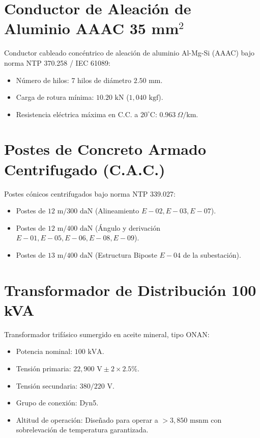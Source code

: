 \documentclass[12pt,a4paper]{report}
\begin{document}
\section{Conductor de Aleación de Aluminio AAAC 35 mm\texorpdfstring{$^2$}{2}}
Conductor cableado concéntrico de aleación de aluminio Al-Mg-Si (AAAC) bajo norma NTP 370.258 / IEC 61089:
\begin{itemize}
    \item Número de hilos: 7 hilos de diámetro $2.50\text{ mm}$.
    \item Carga de rotura mínima: $10.20\text{ kN}$ ($1,040\text{ kgf}$).
    \item Resistencia eléctrica máxima en C.C. a $20^\circ\text{C}$: $0.963\ \Omega/\text{km}$.
\end{itemize}

\section{Postes de Concreto Armado Centrifugado (C.A.C.)}
Postes cónicos centrifugados bajo norma NTP 339.027:
\begin{itemize}
    \item Postes de $12\text{ m} / 300\text{ daN}$ (Alineamiento $E-02, E-03, E-07$).
    \item Postes de $12\text{ m} / 400\text{ daN}$ (Ángulo y derivación $E-01, E-05, E-06, E-08, E-09$).
    \item Postes de $13\text{ m} / 400\text{ daN}$ (Estructura Biposte $E-04$ de la subestación).
\end{itemize}

\section{Transformador de Distribución 100 kVA}
Transformador trifásico sumergido en aceite mineral, tipo ONAN:
\begin{itemize}
    \item Potencia nominal: $100\text{ kVA}$.
    \item Tensión primaria: $22,900\text{ V} \pm 2 \times 2.5\%$.
    \item Tensión secundaria: $380 / 220\text{ V}$.
    \item Grupo de conexión: Dyn5.
    \item Altitud de operación: Diseñado para operar a $> 3,850\text{ msnm}$ con sobrelevación de temperatura garantizada.
\end{itemize}
\end{document}
